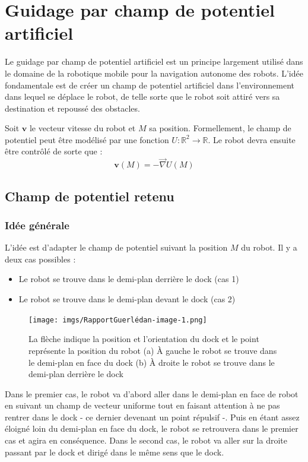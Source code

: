 \documentclass[12pt]{report}
\begin{document}
\section{Guidage par champ de potentiel artificiel}

Le guidage par champ de potentiel artificiel est un principe largement utilisé dans le domaine de la robotique mobile pour la navigation autonome des robots. L'idée fondamentale est de créer un champ de potentiel artificiel dans l'environnement dans lequel se déplace le robot, de telle sorte que le robot soit attiré vers sa destination et repoussé des obstacles.

Soit $\mathbf{v}$ le vecteur vitesse du robot et $M$ sa position. Formellement, le champ de potentiel peut être modélisé par une fonction $U : \mathbb{R}^2 \rightarrow \mathbb{R}$. Le robot devra ensuite être contrôlé de sorte que :
\[ \mathbf{v} (M) = - \vec{\nabla} U (M) \]

\subsection{Champ de potentiel retenu}

\subsubsection{Idée générale}

L'idée est d'adapter le champ de potentiel suivant la position $M$ du robot. Il y a deux cas possibles :
\begin{itemize}
  \item Le robot se trouve dans le demi-plan derrière le dock (cas 1)
  
  \item Le robot se trouve dans le demi-plan devant le dock (cas 2)
\end{itemize}
\begin{figure}[!h]
  \centering
  \texttt{[image: imgs/RapportGuerlédan-image-1.png]}
  \caption{La flèche indique la position et l'orientation du dock et le point représente la position du robot (a) À gauche le robot se trouve dans le demi-plan en face du dock (b) À droite le robot se trouve dans le demi-plan derrière le dock}
\end{figure}

Dans le premier cas, le robot va d'abord aller dans le demi-plan en face de robot en suivant un champ de vecteur uniforme tout en faisant attention à ne pas rentrer dans le dock - ce dernier devenant un point répulsif -. Puis en étant assez éloigné loin du demi-plan en face du dock, le robot se retrouvera dans le premier cas et agira en conséquence. Dans le second cas, le robot va aller sur la droite passant par le dock et dirigé dans le même sens que le dock.
\end{document}
